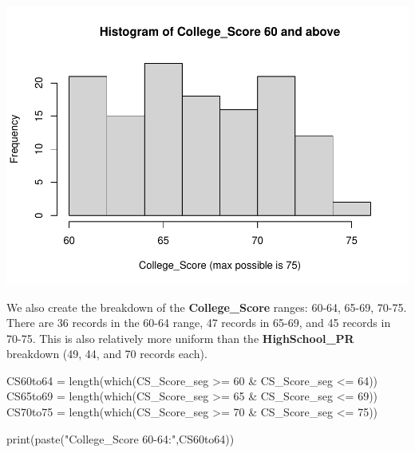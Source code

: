 \documentclass[
]{article}
\newenvironment{Shaded}{\begin{snugshade}}{\end{snugshade}}
\newcommand{\DecValTok}[1]{\textcolor[rgb]{0.00,0.00,0.81}{#1}}
\newcommand{\FunctionTok}[1]{\textcolor[rgb]{0.00,0.00,0.00}{#1}}
\newcommand{\NormalTok}[1]{#1}
\newcommand{\OtherTok}[1]{\textcolor[rgb]{0.56,0.35,0.01}{#1}}
\newcommand{\SpecialCharTok}[1]{\textcolor[rgb]{0.00,0.00,0.00}{#1}}
\newcommand{\StringTok}[1]{\textcolor[rgb]{0.31,0.60,0.02}{#1}}
\begin{document}
\includegraphics{PTT_Analysis_of_Test_Scores_Unfinished_files/figure-latex/college-score-seg-hist-1.pdf}

We also create the breakdown of the \textbf{College\_Score} ranges:
60-64, 65-69, 70-75. There are 36 records in the 60-64 range, 47 records
in 65-69, and 45 records in 70-75. This is also relatively more uniform
than the \textbf{HighSchool\_PR} breakdown (49, 44, and 70 records
each).

\begin{Shaded}
\begin{Highlighting}[]
\NormalTok{CS60to64 }\OtherTok{=} \FunctionTok{length}\NormalTok{(}\FunctionTok{which}\NormalTok{(CS\_Score\_seg }\SpecialCharTok{\textgreater{}=} \DecValTok{60} \SpecialCharTok{\&}\NormalTok{ CS\_Score\_seg }\SpecialCharTok{\textless{}=} \DecValTok{64}\NormalTok{))}
\NormalTok{CS65to69 }\OtherTok{=} \FunctionTok{length}\NormalTok{(}\FunctionTok{which}\NormalTok{(CS\_Score\_seg }\SpecialCharTok{\textgreater{}=} \DecValTok{65} \SpecialCharTok{\&}\NormalTok{ CS\_Score\_seg }\SpecialCharTok{\textless{}=} \DecValTok{69}\NormalTok{))}
\NormalTok{CS70to75 }\OtherTok{=} \FunctionTok{length}\NormalTok{(}\FunctionTok{which}\NormalTok{(CS\_Score\_seg }\SpecialCharTok{\textgreater{}=} \DecValTok{70} \SpecialCharTok{\&}\NormalTok{ CS\_Score\_seg }\SpecialCharTok{\textless{}=} \DecValTok{75}\NormalTok{))}
\end{Highlighting}
\end{Shaded}

\begin{Shaded}
\begin{Highlighting}[]
\FunctionTok{print}\NormalTok{(}\FunctionTok{paste}\NormalTok{(}\StringTok{"College\_Score 60{-}64:"}\NormalTok{,CS60to64))}
\end{Highlighting}
\end{Shaded}
\end{document}
